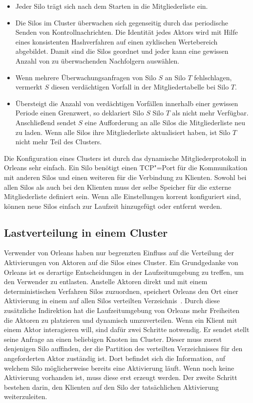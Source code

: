 \begin{itemize}
	\item Jeder Silo trägt sich nach dem Starten in die Mitgliederliste ein.
	\item Die Silos im Cluster überwachen sich gegenseitig durch das periodische Senden von Kontrollnachrichten. Die Identität jedes Aktors wird mit Hilfe eines konsistenten Hashverfahren auf einen zyklischen Wertebereich abgebildet. Damit sind die Silos geordnet und jeder kann eine gewissen Anzahl von zu überwachenden Nachfolgern auswählen.
	\item Wenn mehrere Überwachungsanfragen von Silo $S$ an Silo $T$ fehlschlagen, vermerkt $S$ diesen verdächtigen Vorfall in der Mitgliedertabelle bei Silo $T$.
	\item Übersteigt die Anzahl von verdächtigen Vorfällen innerhalb einer gewissen Periode einen Grenzwert, so deklariert Silo $S$ Silo $T$ als nicht mehr Verfügbar. Anschließend sendet $S$ eine Aufforderung an alle Silos die Mitgliederliste neu zu laden. Wenn alle Silos ihre Mitgliederliste aktualisiert haben, ist Silo $T$ nicht mehr Teil des Clusters.
\end{itemize}

Die Konfiguration eines Clusters ist durch das dynamische Mitgliederprotokoll in Orleans sehr einfach. Ein Silo benötigt einen TCP"=Port für die Kommunikation mit anderen Silos und einen weiteren für die Verbindung zu Klienten. Sowohl bei allen Silos als auch bei den Klienten muss der selbe Speicher für die externe Mitgliederliste definiert sein. Wenn alle Einstellungen korrent konfiguriert sind, können neue Silos einfach zur Laufzeit hinzugefügt oder entfernt werden.

\subsection{Lastverteilung in einem Cluster}

Verwender von Orleans haben nur begrenzten Einfluss auf die Verteilung der Aktivierungen von Aktoren auf die Silos eines Cluster. Ein Grundgedanke von Orleans ist es derartige Entscheidungen in der Laufzeitumgebung zu treffen, um den Verwender zu entlasten. Anstelle Aktoren direkt und mit einem deterministischen Verfahren Silos zuzuordnen, speichert Orleans den Ort einer Aktivierung in einem auf allen Silos verteilten Verzeichnis~\cite[5]{virtualActors}. Durch diese zusätzliche Indirektion hat die Laufzeitumgebung von Orleans mehr Freiheiten die Aktoren zu platzieren und dynamisch umzuverteilen. Wenn ein Klient mit einem Aktor interagieren will, sind dafür zwei Schritte notwendig. Er sendet stellt seine Anfrage an einen beliebigen Knoten im Cluster. Dieser muss zuerst denjenigen Silo auffinden, der die Partition des verteilten Verzeichnisses für den angeforderten Aktor zuständig ist. Dort befindet sich die Information, auf welchem Silo möglicherweise bereits eine Aktivierung läuft. Wenn noch keine Aktivierung vorhanden ist, muss diese erst erzeugt werden. Der zweite Schritt bestehen darin, den Klienten auf den Silo der tatsächlichen Aktivierung weiterzuleiten.

